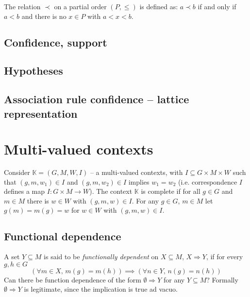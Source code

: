 \documentclass[a4paper]{article}
\newcommand{\brac}[1]{{\left ( #1 \right )}}
\newcommand{\Ctx}{\mathbb{K}}
\begin{document}
The relation $\prec$ on a partial order $(P,\leq)$ is defined as: $a\prec b$ if and only if $a < b$ and there is no $x\in P$ with $a < x < b$.


\subsection{Confidence, support} %
\label{sub:confidence_support}

\subsection{Hypotheses} %
\label{sub:hypotheses}


\subsection{Association rule confidence -- lattice representation} %
\label{sub:association_rule_confidence_lattice_representation}




\section{Multi-valued contexts} %
\label{sec:multi_valued_contexts}

Consider $\Ctx=\brac{G,M,W,I}$ -- a multi-valued contexts, with $I\subseteq G\times M\times W$ such that $(g,m,w_1)\in I$ and $(g,m,w_2)\in I$ implies $w_1=w_2$ (i.e. correspondence $I$ defines a map $I:G\times M\to W$). The context $\Ctx$ is complete if for all $g\in G$ and $m\in M$ there is $w\in W$ with $(g,m,w)\in I$. For any $g\in G$, $m\in M$ let $g(m)=m(g)=w$ for $w\in W$ with $(g,m,w)\in I$.


\subsection{Functional dependence} %
\label{sub:functional_dependence}
A set $Y\subseteq M$ is said to be \emph{functionally dependent} on $X\subseteq M$, $X\Rightarrow Y$, if for every $g,h\in G$ \[ \brac{ \forall m\in X,\,m(g)=m(h) } \implies \brac{ \forall n\in Y,\,n(g)=n(h) } \]
Can there be function dependence of the form $\emptyset \Rightarrow Y$ for any $Y\subseteq M$? Formally $\emptyset \Rightarrow Y$ is legitimate, since the implication is true ad vacuo.
\end{document}
